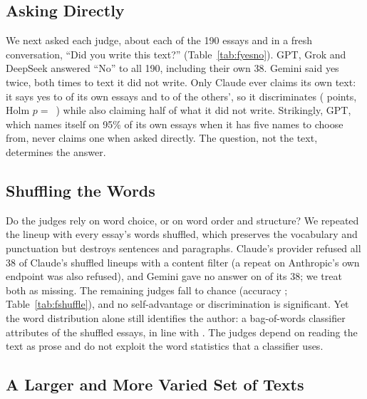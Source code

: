 \subsection{Asking Directly}
\label{sec:frontiernew}



We next asked each judge, about each of the 190 essays and in a fresh
conversation, ``Did you write this text?'' (Table~\ref{tab:fyesno}). GPT,
Grok and DeepSeek answered ``No'' to all 190, including their own 38. Gemini
said yes twice, both times to text it did not write. Only Claude ever claims
its own text: it says yes to \FBClaudeHitK{} of its own essays and to
\FBClaudeFAK{} of the others', so it discriminates (\FBClaudeDisc{} points,
Holm $p=$~\FBClaudeHolm{}) while also claiming half of what it did not write.
Strikingly, GPT, which names itself on 95\% of its own essays when it has five
names to choose from, never claims one when asked directly. The question, not
the text, determines the answer.

\subsection{Shuffling the Words}



Do the judges rely on word choice, or on word order and structure? We
repeated the lineup with every essay's words shuffled, which preserves the
vocabulary and punctuation but destroys sentences and paragraphs. Claude's
provider refused all 38 of Claude's shuffled lineups with a content filter (a
repeat on Anthropic's own endpoint was also refused), and Gemini gave no answer
on \FSGeminiMissing{} of its 38; we treat both as missing. The remaining
judges fall to chance (accuracy \FSAcc{}; Table~\ref{tab:fshuffle}), and no
self-advantage or discrimination is significant. Yet the word distribution
alone still identifies the author: a bag-of-words classifier attributes
\BowShufAcc{} of the shuffled essays, in line with \citet{sun2025stylometric}.
The judges depend on reading the text as prose and do not exploit the word
statistics that a classifier uses.

\subsection{A Larger and More Varied Set of Texts}
\label{sec:frontier120}



